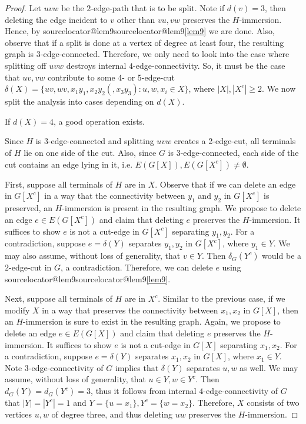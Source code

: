\documentclass[10pt,a4paper]{amsart}
\makeatletter
\let\originalcref\cref
\renewcommand{\cref}[1]{\ifcsname sourcelocator@#1\endcsname\csname sourcelocator@#1\endcsname\else\originalcref{#1}\fi}
\makeatother
\begin{document}
\begin{proof}
Let $uvw$ be the $2$-edge-path that is to be split. Note if $d(v)=3$, then deleting the edge incident to $v$ other than $vu,vw$ preserves the $H$-immersion. Hence, by \cref{lem9} we are done. Also, observe that if a split is done at a vertex of degree at least four, the resulting graph is $3$-edge-connected. Therefore, we only need to look into the case where splitting off $uvw$ destroys internal $4$-edge-connectivity. So, it must be the case that $uv, vw$ contribute to some 4- or 5-edge-cut $\delta (X)=\{ uv, wv, x_1y_1, x_2y_2 (, x_3y_3): u, w, x_i \in X \}$, where $|X|,|X^c|\ge 2$. We now split the analysis into cases depending on $d(X)$.
\begin{claim}
\label{splitdX4}
If $d(X)=4$, a good operation exists.
\end{claim}
Since $H$ is $3$-edge-connected and splitting $uvw$ creates a 2-edge-cut, all terminals of $H$ lie on one side of the cut. Also, since $G$ is $3$-edge-connected, each side of the cut contains an edge lying in it, i.e. $E(G[X]), E(G[X^c])\neq \emptyset$.

First, suppose all terminals of $H$ are in $X$. Observe that if we can delete an edge in $G[X^c]$ in a way that  the connectivity between $y_1$ and $y_2$ in $G[X^c]$ is preserved, an $H$-immersion is present in the resulting graph. We propose to delete an edge $e \in E(G[X^c])$ and claim that deleting $e$ preserves the $H$-immersion. It suffices to show $e$ is not a cut-edge in $G[X^c]$ separating $y_1, y_2$. For a contradiction, suppose $e=\delta(Y)$ separates $y_1,y_2$ in $G[X^c]$, where $y_1\in Y$. We may also assume, without loss of generality, that $v \in Y$. Then $\delta_G(Y^c)$ would be a $2$-edge-cut in $G$, a contradiction. Therefore, we can delete $e$ using \cref{lem9}.

Next, suppose all terminals of $H$ are in $X^c$. Similar to the previous case, if we modify $X$ in a way that preserves the connectivity between $x_1, x_2$ in $G[X]$, then an $H$-immersion is sure to exist in the resulting graph. Again, we propose to delete an edge $e \in E(G[X])$ and claim that deleting $e$ preserves the $H$-immersion. It suffices to show $e$ is not a cut-edge in $G[X]$ separating $x_1, x_2$. For a contradiction, suppose $e=\delta(Y)$ separates $x_1,x_2$ in $G[X]$, where $x_1\in Y$. Note $3$-edge-connectivity of $G$ implies that $\delta(Y)$ separates $u, w$ as well. We may assume, without loss of generality, that $u\in Y, w\in Y^c$. Then $d_G(Y)=d_G(Y^c)=3$, thus it follows from internal $4$-edge-connectivity of $G$ that $|Y|=|Y^c|=1$ and $Y=\{u=x_1\}, Y^c=\{w=x_2\}$. Therefore, $X$ consists of two vertices $u,w$ of degree three, and thus deleting $uw$ preserves the $H$-immersion.


\end{proof}
\end{document}
